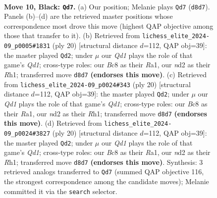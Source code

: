 \documentclass[11pt]{article}
\begin{document}
\clearpage

\begin{figure}[p]\centering
\begin{subfigure}{0.46\textwidth}\centering
\resizebox{\linewidth}{!}{%
\newchessgame
\chessboard[
  setfen={rnbqk1r1/pp2bp1p/4p1p1/2Pp3n/3P4/2N5/PP1NKPPP/1RBQ1B1R b q - 1 10},
  showmover=false,
  pgfstyle=straightmove, color=movearrow, markmove={d8-d7}
]}
\caption{}
\end{subfigure}\hfill
\begin{subfigure}{0.46\textwidth}\centering
\resizebox{\linewidth}{!}{%
\newchessgame
\chessboard[
  setfen={r2qkb1r/1p1n1pp1/p2p1n2/3Pp2p/8/1N2BP2/PPP3PP/R2QKB1R w KQkq - 1 11},
  showmover=false,
  pgfstyle=straightmove, color=movearrow, markmove={d1-d2}
]}
\caption{}
\end{subfigure}
\\[4pt]
\begin{subfigure}{0.46\textwidth}\centering
\resizebox{\linewidth}{!}{%
\newchessgame
\chessboard[
  setfen={r2qkb1r/1p1n1pp1/p2p1n2/3Pp2p/8/1N2BP2/PPP3PP/R2QKB1R w KQkq - 1 11},
  showmover=false,
  pgfstyle=straightmove, color=movearrow, markmove={d1-d2}
]}
\caption{}
\end{subfigure}\hfill
\begin{subfigure}{0.46\textwidth}\centering
\resizebox{\linewidth}{!}{%
\newchessgame
\chessboard[
  setfen={r2qkb1r/1p1n1pp1/p2p1n2/3Pp2p/8/1N2BP2/PPP3PP/R2QKB1R w KQkq - 1 11},
  showmover=false,
  pgfstyle=straightmove, color=movearrow, markmove={d1-d2}
]}
\caption{}
\end{subfigure}
\caption{\textbf{Move 10, Black: \texttt{Qd7}.} (a) Our position; Melanie plays \texttt{Qd7} (\texttt{d8d7}). Panels (b)--(d) are the retrieved master positions whose correspondence most drove this move (highest QAP objective among those that transfer to it). (b) Retrieved from \texttt{lichess\_elite\_2024-09\_p0005\#1831} (ply 20) [structural distance $d$=112, QAP obj=39]: the master played \texttt{Qd2}; under $\mu$ our \emph{Qd1} plays the role of that game's \emph{Qd1}; cross-type roles: our \emph{B}c8 as their \emph{R}a1, our \emph{n}d2 as their \emph{R}h1; transferred move \texttt{d8d7} \textbf{(endorses this move)}. (c) Retrieved from \texttt{lichess\_elite\_2024-09\_p0024\#343} (ply 20) [structural distance $d$=112, QAP obj=39]: the master played \texttt{Qd2}; under $\mu$ our \emph{Qd1} plays the role of that game's \emph{Qd1}; cross-type roles: our \emph{B}c8 as their \emph{R}a1, our \emph{n}d2 as their \emph{R}h1; transferred move \texttt{d8d7} \textbf{(endorses this move)}. (d) Retrieved from \texttt{lichess\_elite\_2024-09\_p0024\#3827} (ply 20) [structural distance $d$=112, QAP obj=39]: the master played \texttt{Qd2}; under $\mu$ our \emph{Qd1} plays the role of that game's \emph{Qd1}; cross-type roles: our \emph{B}c8 as their \emph{R}a1, our \emph{n}d2 as their \emph{R}h1; transferred move \texttt{d8d7} \textbf{(endorses this move)}. Synthesis: 3 retrieved analogs transferred to \texttt{Qd7} (summed QAP objective 116, the strongest correspondence among the candidate moves); Melanie committed it via the \texttt{search} selector.}
\label{fig:thought-m19}
\end{figure}
\end{document}
